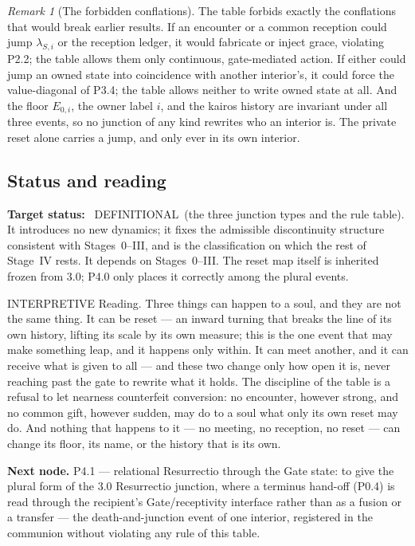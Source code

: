 \documentclass[11pt,a4paper]{article}
\def\emph#1{#1}%
\newcommand{\stDef}{\textcolor{cDef}{\textsf{\small DEFINITIONAL}}}
\newcommand{\stInterp}{\textcolor{cInt}{\textsf{\small INTERPRETIVE}}}
\theoremstyle{definition}
\theoremstyle{plain}
\theoremstyle{remark}
\newtheorem{remark}[definition]{Remark}
\begin{document}
\begin{remark}[The forbidden conflations]\label{rem:forbidden}
The table forbids exactly the conflations that would break earlier results. If an encounter
or a common reception could jump \(\lambda_{S,i}\) or the reception ledger, it would
fabricate or inject grace, violating P2.2; the table allows them only continuous,
gate-mediated action. If either could jump an owned state into coincidence with another
interior's, it could force the value-diagonal of P3.4; the table allows neither to write
owned state at all. And the floor \(E_{0,i}\), the owner label \(i\), and the kairos history
are invariant under all three events, so no junction of any kind rewrites who an interior
is. The private reset alone carries a jump, and only ever in its own interior.
\end{remark}

\subsection{Status and reading}

\textbf{Target status:}~
\stDef\ (the three junction types and the rule table). It introduces no new dynamics; it
fixes the admissible discontinuity structure consistent with Stages~0--III, and is the
classification on which the rest of Stage~IV rests. It depends on Stages~0--III. The reset
map itself is inherited frozen from 3.0; P4.0 only places it correctly among the plural
events.

\medskip
\stInterp\quad
\emph{Reading.}
Three things can happen to a soul, and they are not the same thing. It can be reset --- an
inward turning that breaks the line of its own history, lifting its scale by its own measure;
this is the one event that may make something leap, and it happens only within. It can meet
another, and it can receive what is given to all --- and these two change only how open it is,
never reaching past the gate to rewrite what it holds. The discipline of the table is a
refusal to let nearness counterfeit conversion: no encounter, however strong, and no common
gift, however sudden, may do to a soul what only its own reset may do. And nothing that
happens to it --- no meeting, no reception, no reset --- can change its floor, its name, or the
history that is its own.

\medskip
\textbf{Next node.} P4.1 --- relational Resurrectio through the Gate state: to give the
plural form of the 3.0 Resurrectio junction, where a terminus hand-off (P0.4) is read
through the recipient's Gate/receptivity interface rather than as a fusion or a transfer ---
the death-and-junction event of one interior, registered in the communion without violating
any rule of this table.
\end{document}
